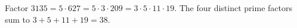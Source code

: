 Factor $3135=5\cdot627=5\cdot3\cdot209=3\cdot5\cdot11\cdot19$. The four distinct prime factors sum to $3+5+11+19=\boxed{38}$.
